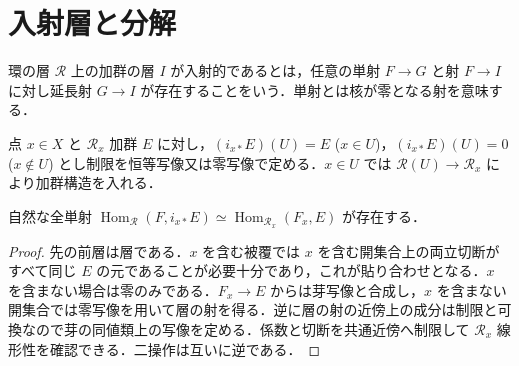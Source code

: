 \section{入射層と分解}
\begin{defn}[入射層]
環の層 $\mathcal R$ 上の加群の層 $I$ が入射的であるとは，任意の単射 $F\to G$ と射 $F\to I$ に対し延長射 $G\to I$ が存在することをいう．単射とは核が零となる射を意味する．
\end{defn}
\begin{defn}[点に集中する層]
点 $x\in X$ と $\mathcal R_x$ 加群 $E$ に対し，$(i_{x*}E)(U)=E$ ($x\in U$)，$(i_{x*}E)(U)=0$ ($x\notin U$) とし制限を恒等写像又は零写像で定める．$x\in U$ では $\mathcal R(U)\to\mathcal R_x$ により加群構造を入れる．
\end{defn}
\begin{prop}[点に集中する層の随伴性]
自然な全単射 $\operatorname{Hom}_{\mathcal R}(F,i_{x*}E)\simeq\operatorname{Hom}_{\mathcal R_x}(F_x,E)$ が存在する．
\end{prop}
\begin{proof}
先の前層は層である．$x$ を含む被覆では $x$ を含む開集合上の両立切断がすべて同じ $E$ の元であることが必要十分であり，これが貼り合わせとなる．$x$ を含まない場合は零のみである．$F_x\to E$ からは芽写像と合成し，$x$ を含まない開集合では零写像を用いて層の射を得る．逆に層の射の近傍上の成分は制限と可換なので芽の同値類上の写像を定める．係数と切断を共通近傍へ制限して $\mathcal R_x$ 線形性を確認できる．二操作は互いに逆である．
\end{proof}

